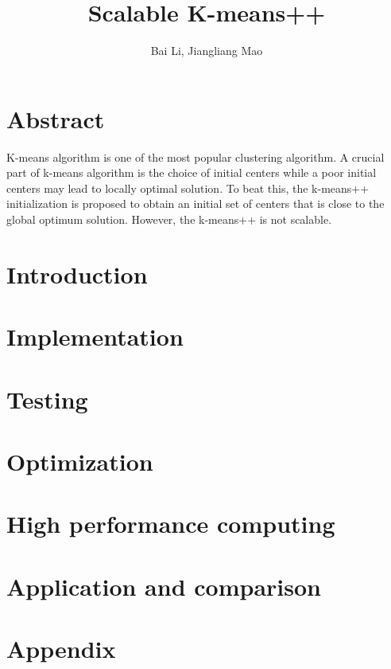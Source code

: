 \documentclass{statsoc}
\title[Short title]{Scalable K-means++}
\author[ {\it et al.}]{Bai Li, Jiangliang Mao}
\begin{document}
  
\section*{Abstract}
K-means algorithm is one of the most popular clustering algorithm. A crucial part of k-means algorithm is the choice of initial centers while a poor initial centers may lead to locally optimal solution. To beat this, the k-means++ initialization is proposed to obtain an initial set of centers that is close to the global optimum solution. However, the k-means++ is not scalable.

  
\section{Introduction}






\section{Implementation}


\section{Testing}

\section{Optimization}

\section{High performance computing}

\section{Application and comparison}
\clearpage
\newpage




\section*{Appendix}
\clearpage
\newpage
\end{document}

